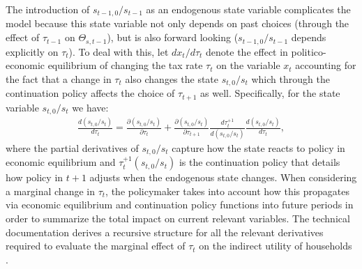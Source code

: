 The introduction of $s_{t-1,0}/s_{t-1}$ as an endogenous state variable complicates the model because this state variable not only depends on past choices (through the effect of $\tau_{t-1}$ on $\Theta_{s,t-1}$), but is also forward looking ($s_{t-1,0}/s_{t-1}$ depends explicitly on $\tau_t$). To deal with this, let $dx_t/d\tau_t$ denote the effect in politico-economic equilibrium of changing the tax rate $\tau_t$ on the variable $x_t$ accounting for the fact that a change in $\tau_t$ also changes the state $s_{t,0}/s_t$ which through the continuation policy affects the choice of $\tau_{t+1}$ as well. Specifically, for the state variable $s_{t,0}/s_t$ we have:
\begin{align*}
    \frac{d(s_{t,0}/s_t)}{d\tau_t} = \frac{\partial (s_{t,0}/s_t)}{\partial \tau_t} + \frac{\partial (s_{t,0}/s_t)}{\partial \tau_{t+1}} \frac{d\tau_t^{+1}}{d(s_{t,0}/s_t)}\frac{d(s_{t,0}/s_t)}{d\tau_t},
\end{align*}
where the partial derivatives of $s_{t,0}/s_t$ capture how the state reacts to policy in economic equilibrium and $\tau_t^{+1}(s_{t,0}/s_t)$ is the continuation policy that details how policy in $t+1$ adjusts when the endogenous state changes.
When considering a marginal change in $\tau_t$, the policymaker takes into account how this propagates via economic equilibrium and continuation policy functions into future periods in order to summarize the total impact on current relevant variables. The technical documentation derives a recursive structure for all the relevant derivatives required to evaluate the marginal effect of $\tau_t$ on the indirect utility of households \parencite[section \textit{Informal Savings Model}]{BergGE26doc}. 


